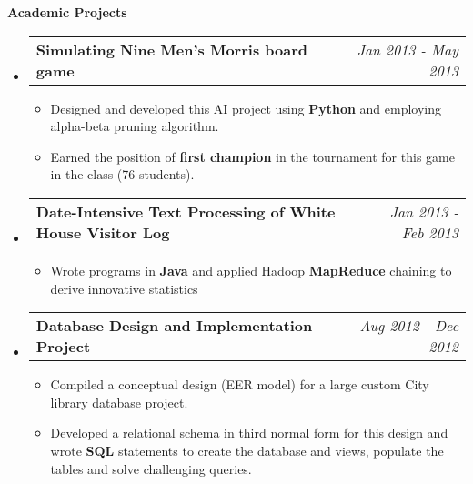 \documentclass[letterpaper,11pt]{article}
\makeatletter
\newcommand{\resitem}[1]{\item[\ding{226}] #1 \vspace{-2pt}}
\newcommand{\resheading}[1]{{\large \colorbox{mygrey}{\begin{minipage}{\textwidth}{\textbf{#1 \vphantom{p\^{E}}}}\end{minipage}}}}
\newcommand{\ressubheading}[4]{
\begin{tabular*}{7.0in}{l@{\extracolsep{\fill}}r}
		\textbf{#1} & #2 \\
		\textit{#3} & \textit{#4} \\
\end{tabular*}\vspace{-6pt}}
\newcommand{\reslineheading}[2]{
\begin{tabular*}{7.0in}{l@{\extracolsep{\fill}}r}
		\textbf{#1} & #2 \\
\end{tabular*}\vspace{-6pt}}
\makeatother
\begin{document}
\resheading{Academic Projects}
\begin{itemize}


\item
	\reslineheading{Simulating Nine Men's Morris board game}{\textit{Jan 2013 - May 2013}}
	\begin{itemize}
		\resitem{Designed and developed this AI project using \textbf{Python} and employing alpha-beta pruning algorithm.}
		\resitem{Earned the position of \textbf{first champion} in the tournament for this game in the class (76 students).}
	\end{itemize}

\item
	\reslineheading{Date-Intensive Text Processing of White House Visitor Log}{\textit{Jan 2013 - Feb 2013}}
	\begin{itemize}
		\resitem{Wrote programs in \textbf{Java} and applied Hadoop \textbf{MapReduce} chaining to derive innovative statistics}%
	\end{itemize}

\item
	\reslineheading{Database Design and Implementation Project}{\textit{Aug 2012 - Dec 2012}}
	\begin{itemize}
		\resitem{Compiled a conceptual design (EER model) for a large custom City library database project.}
		\resitem{Developed a relational schema in third normal form for this design and wrote \textbf{SQL} statements to create the database and views, populate the tables and solve challenging queries.}
	\end{itemize}


\end{itemize}
\end{document}
